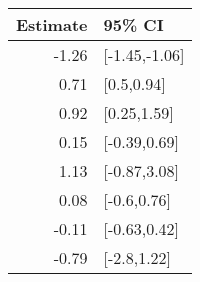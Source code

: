 \begin{tabular}{rl}
  \hline
Estimate & 95\% CI \\ 
  \hline
-1.26 & [-1.45,-1.06] \\ 
  0.71 & [0.5,0.94] \\ 
  0.92 & [0.25,1.59] \\ 
  0.15 & [-0.39,0.69] \\ 
  1.13 & [-0.87,3.08] \\ 
  0.08 & [-0.6,0.76] \\ 
  -0.11 & [-0.63,0.42] \\ 
  -0.79 & [-2.8,1.22] \\ 
   \hline
\end{tabular}

